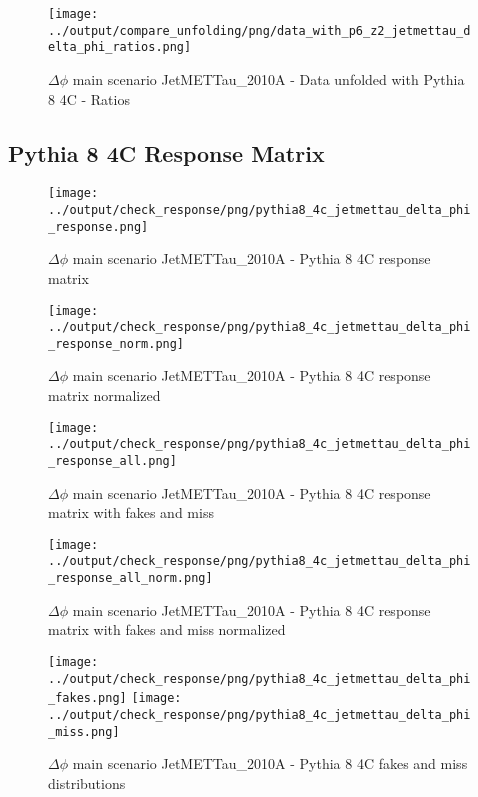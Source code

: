 \documentclass[11pt]{book}
\begin{document}
\begin{figure}[ht]
\centering
\texttt{[image: ../output/compare\_unfolding/png/data\_with\_p6\_z2\_jetmettau\_delta\_phi\_ratios.png]}
\caption{$\Delta\phi$ main scenario JetMETTau\_2010A - Data unfolded with Pythia 8 4C - Ratios}
\label{data_p6_jetmettau_delta_phi_b}
\end{figure}

\clearpage
\subsection{Pythia 8 4C Response Matrix}

\begin{figure}[ht]
\centering
\texttt{[image: ../output/check\_response/png/pythia8\_4c\_jetmettau\_delta\_phi\_response.png]}
\caption{$\Delta\phi$ main scenario JetMETTau\_2010A - Pythia 8 4C response matrix}
\label{p8_jetmettau_delta_phi_response}
\end{figure}

\begin{figure}[ht]
\centering
\texttt{[image: ../output/check\_response/png/pythia8\_4c\_jetmettau\_delta\_phi\_response\_norm.png]}
\caption{$\Delta\phi$ main scenario JetMETTau\_2010A - Pythia 8 4C response matrix normalized}
\label{p8_jetmettau_delta_phi_response_norm}
\end{figure}

\begin{figure}[ht]
\centering
\texttt{[image: ../output/check\_response/png/pythia8\_4c\_jetmettau\_delta\_phi\_response\_all.png]}
\caption{$\Delta\phi$ main scenario JetMETTau\_2010A - Pythia 8 4C response matrix with fakes and miss}
\label{p8_jetmettau_delta_phi_response_all}
\end{figure}

\begin{figure}[ht]
\centering
\texttt{[image: ../output/check\_response/png/pythia8\_4c\_jetmettau\_delta\_phi\_response\_all\_norm.png]}
\caption{$\Delta\phi$ main scenario JetMETTau\_2010A - Pythia 8 4C response matrix with fakes and miss normalized}
\label{p8_jetmettau_delta_phi_response_all_norm}
\end{figure}

\begin{figure}[ht]
\centering
\texttt{[image: ../output/check\_response/png/pythia8\_4c\_jetmettau\_delta\_phi\_fakes.png]}
\texttt{[image: ../output/check\_response/png/pythia8\_4c\_jetmettau\_delta\_phi\_miss.png]}
\caption{$\Delta\phi$ main scenario JetMETTau\_2010A - Pythia 8 4C fakes and miss distributions}
\label{p8_jetmettau_delta_phi_fakesmiss}
\end{figure}
\end{document}
